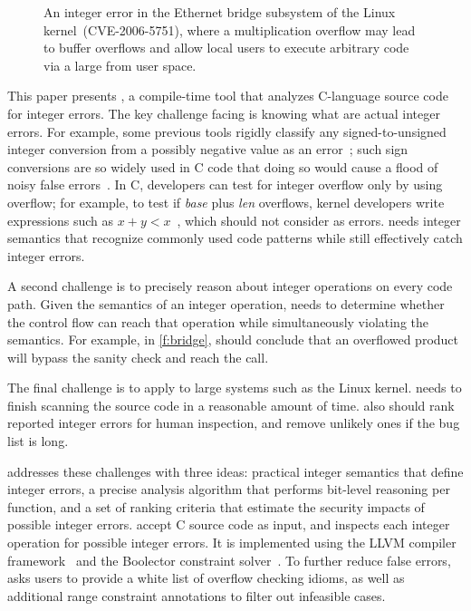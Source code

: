 \begin{figure}[t]
\centering

\vspace{-1em}
\caption{An integer error in the Ethernet bridge subsystem of the
Linux kernel~(CVE-2006-5751), where a multiplication overflow
may lead to buffer overflows and allow local users to execute
arbitrary code via a large  from user space.
}
\label{f:bridge}
\end{figure}

This paper presents \sys, a compile-time tool that analyzes C-language
source code for integer errors.
%
The key challenge facing \sys is knowing what are actual integer
errors.
For example, some previous tools
rigidly classify any signed-to-unsigned integer conversion from a
possibly negative value as an error~\cite{brumley:rich, moy:z3prefix,
seacord:secure-c}; such sign conversions are so widely used in C
code that doing so would cause a flood of noisy false
errors~\cite[\subsectionautorefname~6.2]{moy:z3prefix}.
In C, developers can test for integer overflow only by using overflow; 
for example, to test if \textit{base} plus \textit{len} overflows,
kernel developers write expressions such as $x + y < x$~\cite{ioc},
which \sys should not consider as errors.
\sys needs integer semantics that recognize commonly used code
patterns while still effectively catch integer errors.

A second challenge is to precisely reason about integer operations
on every code path.  Given the semantics of an integer operation,
\sys needs to determine whether the control flow can reach that
operation while simultaneously violating the semantics.  For
example, in \autoref{f:bridge}, \sys should conclude that an overflowed
product  will bypass the sanity check and reach the
 call.

The final challenge is to apply \sys to large systems such as the
Linux kernel.  \sys needs to finish scanning the source code in a
reasonable amount of time.  \sys also should rank reported integer
errors for human inspection, and remove unlikely ones if the bug
list is long.

\sys addresses these challenges with three ideas: practical integer
semantics that define integer errors, a precise analysis algorithm
that performs bit-level reasoning per function, and a set of ranking
criteria that estimate the security impacts of possible integer
errors.  \sys accept C source code as input, and inspects each
integer operation for possible integer errors.
%
It is implemented using the LLVM compiler framework~\cite{lattner:llvm}
and the Boolector constraint solver~\cite{boolector}.
%
To further reduce false errors, \sys asks users to provide a white
list of overflow checking idioms, as well as additional range
constraint annotations to filter out infeasible cases.

